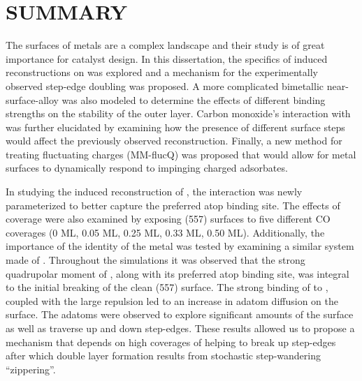 \chapter{SUMMARY}

The surfaces of metals are a complex landscape and their study is of great
importance for catalyst design. In this dissertation, the specifics of 
induced reconstructions on  was explored and a mechanism for the
experimentally observed step-edge doubling was proposed. A more complicated
bimetallic  near-surface-alloy was also modeled to determine
the effects of different binding strengths on the stability of the outer
 layer.  Carbon monoxide's interaction with  was further
elucidated by examining how the presence of different surface steps would
affect the previously observed reconstruction. Finally, a new method for
treating fluctuating charges (MM-flucQ) was proposed that would allow for metal
surfaces to dynamically respond to impinging charged adsorbates.

In studying the induced reconstruction of , the 
interaction was newly parameterized to better capture the preferred atop
binding site. The effects of coverage were also examined by exposing (557)
 surfaces to five different CO coverages (0 ML, 0.05 ML, 0.25 ML, 0.33
ML, 0.50 ML).  Additionally, the importance of the identity of the metal was
tested by examining a similar system made of . Throughout the
simulations it was observed that the strong quadrupolar moment of ,
along with its preferred atop binding site, was integral to the initial
breaking of the clean (557) surface. The strong binding of  to ,
coupled with the large  repulsion led to an increase in
 adatom diffusion on the surface. The adatoms were observed to explore
significant amounts of the surface as well as traverse up and down step-edges.
These results allowed us to propose a mechanism that depends on high coverages
of  helping to break up step-edges after which double layer formation
results from stochastic step-wandering ``zippering''.

